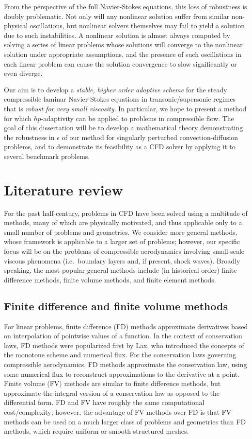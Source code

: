 From the perspective of the full Navier-Stokes equations, this loss of robustness is doubly problematic.  Not only will any nonlinear solution suffer from similar non-physical oscillations, but nonlinear solvers themselves may fail to yield a solution due to such instabilities.  A nonlinear solution is almost always computed by solving a series of linear problems whose solutions will converge to the nonlinear solution under appropriate assumptions, and the presence of such oscillations in each linear problem can cause the solution convergence to slow significantly or even diverge.  

Our aim is to develop a \emph{stable, higher order adaptive scheme} for the steady compressible laminar Navier-Stokes equations in transonic/supersonic regimes that is \emph{robust for very small viscosity}.  In particular, we hope to present a method for which $hp$-adaptivity can be applied to problems in compressible flow.  The goal of this dissertation will be to develop a mathematical theory demonstrating the robustness in $\epsilon$ of our method for singularly perturbed convection-diffusion problems, and to demonstrate its feasibility as a CFD solver by applying it to several benchmark problems.  

\section{Literature review}

For the past half-century, problems in CFD have been solved using a multitude of methods, many of which are physically motivated, and thus applicable only to a small number of problems and geometries. We consider more general methods, whose framework is applicable to a larger set of problems; however, our specific focus will be on the problems of compressible aerodynamics involving small-scale viscous phenomena (i.e.\ boundary layers and, if present, shock waves). Broadly speaking, the most popular general methods include (in historical order) finite difference methods, finite volume methods, and finite element methods.  

\subsection{Finite difference and finite volume methods}

For linear problems, finite difference (FD) methods approximate derivatives based on interpolation of pointwise values of a function.  In the context of conservation laws, FD methods were popularized first by Lax, who introduced the concepts of the monotone scheme and numerical flux. For the conservation laws governing compressible aerodynamics, FD methods approximate the conservation law, using some numerical flux to reconstruct approximations to the derivative at a point. Finite volume (FV) methods are similar to finite difference methods, but approximate the integral version of a conservation law as opposed to the differential form. FD and FV have roughly the same computational cost/complexity; however, the advantage of FV methods over FD is that FV methods can be used on a much larger class of problems and geometries than FD methods, which require uniform or smooth structured meshes. 

